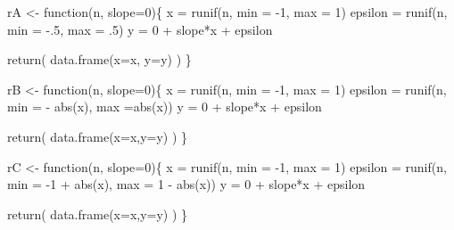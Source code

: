 \documentclass[
  letterpaper,
  DIV=11,
  numbers=noendperiod]{scrreprt}
\newenvironment{Shaded}{\begin{snugshade}}{\end{snugshade}}
\newcommand{\AttributeTok}[1]{\textcolor[rgb]{0.40,0.45,0.13}{#1}}
\newcommand{\ControlFlowTok}[1]{\textcolor[rgb]{0.00,0.23,0.31}{#1}}
\newcommand{\DecValTok}[1]{\textcolor[rgb]{0.68,0.00,0.00}{#1}}
\newcommand{\FunctionTok}[1]{\textcolor[rgb]{0.28,0.35,0.67}{#1}}
\newcommand{\NormalTok}[1]{\textcolor[rgb]{0.00,0.23,0.31}{#1}}
\newcommand{\OtherTok}[1]{\textcolor[rgb]{0.00,0.23,0.31}{#1}}
\newcommand{\SpecialCharTok}[1]{\textcolor[rgb]{0.37,0.37,0.37}{#1}}
\begin{document}
\begin{Shaded}
\begin{Highlighting}[]
\NormalTok{rA }\OtherTok{\textless{}{-}} \ControlFlowTok{function}\NormalTok{(n, }\AttributeTok{slope=}\DecValTok{0}\NormalTok{)\{}
\NormalTok{  x       }\OtherTok{=} \FunctionTok{runif}\NormalTok{(n, }\AttributeTok{min =} \SpecialCharTok{{-}}\DecValTok{1}\NormalTok{,  }\AttributeTok{max =} \DecValTok{1}\NormalTok{)}
\NormalTok{  epsilon }\OtherTok{=} \FunctionTok{runif}\NormalTok{(n, }\AttributeTok{min =} \SpecialCharTok{{-}}\NormalTok{.}\DecValTok{5}\NormalTok{, }\AttributeTok{max =}\NormalTok{ .}\DecValTok{5}\NormalTok{)}
\NormalTok{  y       }\OtherTok{=} \DecValTok{0} \SpecialCharTok{+}\NormalTok{ slope}\SpecialCharTok{*}\NormalTok{x }\SpecialCharTok{+}\NormalTok{ epsilon}
  
  \FunctionTok{return}\NormalTok{(}
    \FunctionTok{data.frame}\NormalTok{(}\AttributeTok{x=}\NormalTok{x, }\AttributeTok{y=}\NormalTok{y)}
\NormalTok{    )}
\NormalTok{\}}

\NormalTok{rB }\OtherTok{\textless{}{-}} \ControlFlowTok{function}\NormalTok{(n, }\AttributeTok{slope=}\DecValTok{0}\NormalTok{)\{}
\NormalTok{  x       }\OtherTok{=} \FunctionTok{runif}\NormalTok{(n, }\AttributeTok{min =} \SpecialCharTok{{-}}\DecValTok{1}\NormalTok{, }\AttributeTok{max =} \DecValTok{1}\NormalTok{)}
\NormalTok{  epsilon }\OtherTok{=} \FunctionTok{runif}\NormalTok{(n, }\AttributeTok{min =} \SpecialCharTok{{-}} \FunctionTok{abs}\NormalTok{(x), }\AttributeTok{max =}\FunctionTok{abs}\NormalTok{(x))}
\NormalTok{  y       }\OtherTok{=} \DecValTok{0} \SpecialCharTok{+}\NormalTok{ slope}\SpecialCharTok{*}\NormalTok{x }\SpecialCharTok{+}\NormalTok{ epsilon}
  
  \FunctionTok{return}\NormalTok{(}
    \FunctionTok{data.frame}\NormalTok{(}\AttributeTok{x=}\NormalTok{x,}\AttributeTok{y=}\NormalTok{y)}
\NormalTok{    )}
\NormalTok{\}}

\NormalTok{rC }\OtherTok{\textless{}{-}} \ControlFlowTok{function}\NormalTok{(n, }\AttributeTok{slope=}\DecValTok{0}\NormalTok{)\{}
\NormalTok{  x       }\OtherTok{=} \FunctionTok{runif}\NormalTok{(n, }\AttributeTok{min =} \SpecialCharTok{{-}}\DecValTok{1}\NormalTok{, }\AttributeTok{max =} \DecValTok{1}\NormalTok{)}
\NormalTok{  epsilon }\OtherTok{=} \FunctionTok{runif}\NormalTok{(n, }\AttributeTok{min =} \SpecialCharTok{{-}}\DecValTok{1} \SpecialCharTok{+} \FunctionTok{abs}\NormalTok{(x), }\AttributeTok{max =} \DecValTok{1} \SpecialCharTok{{-}} \FunctionTok{abs}\NormalTok{(x))}
\NormalTok{  y       }\OtherTok{=} \DecValTok{0} \SpecialCharTok{+}\NormalTok{ slope}\SpecialCharTok{*}\NormalTok{x }\SpecialCharTok{+}\NormalTok{ epsilon}

  \FunctionTok{return}\NormalTok{(}
    \FunctionTok{data.frame}\NormalTok{(}\AttributeTok{x=}\NormalTok{x,}\AttributeTok{y=}\NormalTok{y)}
\NormalTok{    )}
\NormalTok{\}}
\end{Highlighting}
\end{Shaded}
\end{document}
